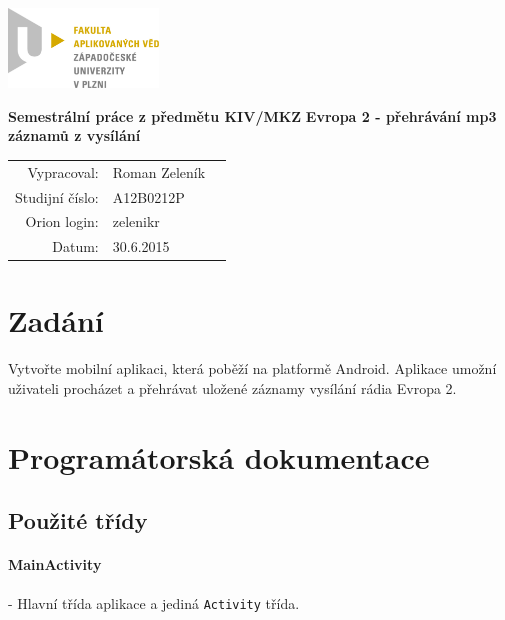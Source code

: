 \documentclass[12pt,a4paper,titlepage]{article}
\begin{document}
\includegraphics[width = 4cm]{LOGO.png} 
\\[8\baselineskip]
\begin{center}

\LARGE\textbf{Semestrální práce z předmětu KIV/MKZ}\linebreak\linebreak
\Large\textbf{Evropa 2 - přehrávání mp3 záznamů z vysílání}\\[11\baselineskip]
\end{center}

\begin{center}
\begin{tabular}{rll}
Vypracoval: & Roman Zeleník \\ 
Studijní číslo: & A12B0212P \\ 
Orion login: & zelenikr \\ 
Datum: & \multicolumn{2}{l}{30.6.2015} \\ 
\end{tabular} 
\end{center}
\thispagestyle{empty}
\pagebreak 

\renewcommand{\cftsecleader}{\cftdotfill{\cftdotsep}}
\tableofcontents
\thispagestyle{empty}
\pagebreak
\setcounter{page}{1}
\section{Zadání}
	\paragraph{}
	Vytvořte mobilní aplikaci, která poběží na platformě Android. Aplikace umožní uživateli procházet a přehrávat uložené záznamy vysílání rádia Evropa 2.

\section{Programátorská dokumentace}
	\subsection{Použité třídy}
	\paragraph{MainActivity}
	- Hlavní třída aplikace a jediná \texttt{Activity} třída. 
\end{document}
